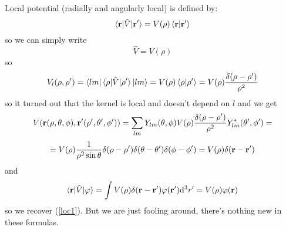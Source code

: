 Local potential (radially and angularly local) is defined by: 
\begin{equation*}
  \mathinner{\langle{{\bf r}|\hat V|{\bf r'}}\rangle}=V(\rho)\mathinner{\langle{{\bf r}|{\bf r'}}\rangle}
\end{equation*}
so we can simply write 
\begin{equation}
  \hat V=V(\rho)  \label{loc1}
\end{equation}
so 
\begin{equation*}
  V_l(\rho,\rho') =\mathinner{\langle{lm}|}\mathinner{\langle{\rho|\hat V|\rho'}\rangle}\mathinner{|{lm}\rangle} =V(\rho)\mathinner{\langle{\rho|\rho'}\rangle} =V(\rho){\delta(\rho-\rho')\over\rho^2}
\end{equation*}
so it turned out that the kernel is local and doesn't depend on $l$ and we get 
\begin{equation*}
  V({\bf r}(\rho,\theta,\phi), {\bf r'}(\rho',\theta',\phi'))= \sum_{lm}Y_{lm}(\theta,\phi) V(\rho){\delta(\rho-\rho')\over\rho^2} Y_{lm}^*(\theta',\phi')=
\end{equation*}
\begin{equation*}
  =V(\rho){1\over\rho^2\sin\theta} \delta(\rho-\rho')\delta(\theta-\theta')\delta(\phi-\phi')= V(\rho)\delta({\bf r}-{\bf r}')
\end{equation*}
and 
\begin{equation*}
  \mathinner{\langle{{\bf r}|\hat V|\varphi}\rangle}=\int V(\rho)\delta({\bf r}-{\bf r}') \varphi({\bf r'}){\rm d}^3r'=V(\rho)\varphi({\bf r})
\end{equation*}
so we recover (\ref{loc1}). But we are just fooling around, there's nothing new in these formulas.

